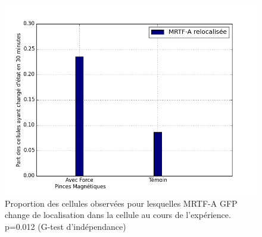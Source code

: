 \documentclass                                                                                                                                                                                                                                                                                                                                       {report}
\begin{document}
\begin{figure}[p]
\includegraphics[scale=0.4]{Figures/Pinces_vs_temoin.png} 
\caption{\label{pinces_vs_temoin} Proportion des cellules observées pour lesquelles MRTF-A GFP change de localisation dans la cellule au cours de l'expérience. p=0.012 (G-test d'indépendance)}
\end{figure}
\end{document}
